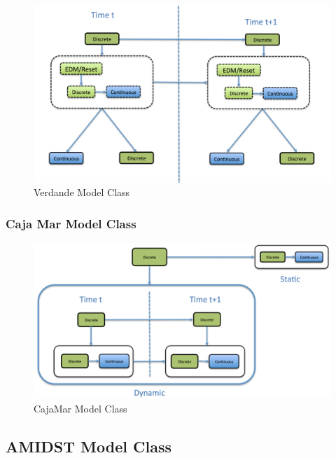 \begin{figure}
\begin{center}
\caption{\label{Figure:VerdandeModelClass} Verdande Model Class}
\includegraphics[scale=0.4]{./figures/VerdandeModelClass}
\end{center}
\end{figure}


\subsubsection*{Caja Mar Model Class}

\begin{figure}
\begin{center}
\caption{\label{Figure:CajaMarModelClass} CajaMar Model Class}
\includegraphics[scale=0.4]{./figures/CajaMarModelClass}
\end{center}
\end{figure}



\subsection{AMIDST Model Class}




